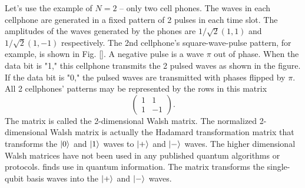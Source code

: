 \documentclass[oneside, letter, 12pt]{book}
\begin{document}
Let's use the example of $N=2$ -- only two cell phones. The waves in each cellphone are generated in a fixed pattern of 2 pulses in each time slot. The amplitudes of the waves generated by the phones are $1/{\sqrt{2}} (1,1)$ and $1/{\sqrt{2}} (1,-1)$ respectively. The 2nd cellphone's square-wave-pulse pattern, for example, is shown in Fig. \ref{}. A negative pulse is a wave $\pi$ out of phase. When the data bit is "1," this cellphone transmits the 2 pulsed waves as shown in the figure. If the data bit is "0," the pulsed waves are transmitted with phases flipped by $\pi$. All 2 cellphones' patterns may be represented by the rows in this matrix
\begin{equation}\label{e-CDMA2}
  \begin{pmatrix} %
    1 & 1  \\
    1 & -1
    \end{pmatrix}.
\end{equation}
The matrix is called the 2-dimensional Walsh matrix. The normalized 2-dimensional Walsh matrix is actually the Hadamard transformation matrix that transforms the $\vert {0} \rangle_{}$ and $\vert {1} \rangle_{}$ waves to $\vert {+} \rangle_{}$ and  $\vert {-} \rangle_{}$ waves. The higher dimensional Walsh matrices have not been used in any published quantum algorithms or protocols.
finds use in quantum information. The matrix transforms the single-qubit basis waves into the $\vert {+} \rangle_{}$ and $\vert {-} \rangle_{}$ waves.
\end{document}
